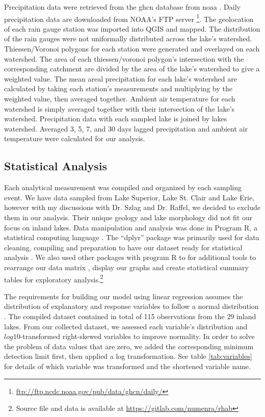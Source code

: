 Precipitation data were retrieved from the \gls{ghcn} database from \gls{noaa} \cite{menne_global_2012}. Daily precipitation data are downloaded from NOAA's FTP server \footnote{\url{ftp://ftp.ncdc.noaa.gov/pub/data/ghcn/daily/}}.  The geolocation of each rain gauge station was imported into QGIS and mapped. The distribution of the rain gauges were not uniformally distributed across the lake's watershed. Thiessen/Voronoi polygons for each station were generated and overlayed on each watershed. The area of each thiessen/voronoi polygon's intersection with the corresponding catchment are divided by the area of the lake's watershed to give a weighted value. The mean areal precipitation for each lake's watershed are calculated by taking each station's measurements and multiplying by the weighted value, then averaged together.  Ambient air temperature for each watershed is simply averaged together with their intersection of the lake's watershed. Precipitation data with each sampled lake is joined by lakes watershed. Averaged 3, 5, 7, and 30 days lagged precipitation and ambient air temperature were calculated for our analysis.

\subsection{Statistical Analysis}

Each analytical measurement was compiled and organized by each sampling event. We have data sampled from Lake Superior, Lake St. Clair and Lake Erie, however with my discussions with Dr. Szlag and Dr. Raffel, we decided to exclude them in our analysis.  Their unique geology and lake morphology did not fit our focus on inland lakes.
Data manipulation and analysis was done in Program R, a statistical computing language \cite{r_core_team_r:_2018}. The ``dplyr'' package was primarily used for data cleaning, compiling and preparation to have our dataset ready for statistical analysis \cite{wickham_dplyr:_2017}. We also used other packages with program R to for additional tools to rearrange our data matrix \cite{robinson_broom:_2018}, display our graphs\cite{wickham_ggplot2:_2009,schloerke_ggally:_2017, garnier_viridis:_2018, wei_r_2017} and create statistical summary tables \cite{leifeld_texreg:_2013,  wickham_tidyverse:_2017, zhu_kableextra:_2018, hlavac_stargazer:_2018, robinson_broom:_2018} for exploratory analysis.\footnote{Source file and data is available at \url{https://gitlab.com/numenra/rhab}}

The requirements for building our model using linear regression assumes the distribution of explanatory and response variables to follow a normal distribution \cite{bates_fitting_2015,crawley_r_2007}. The compiled dataset contained in total of 115 observations from the 29 inland lakes.
From our collected dataset, we assessed each variable's distribution and $log10$-transformed right-skewed variables to improve normality. In order to solve the problem of data values that are zero, we added the corresponding minimum detection limit first, then applied a log transformation. See table \ref{tab:variables} for details of which variable was transformed and the shortened variable name.

